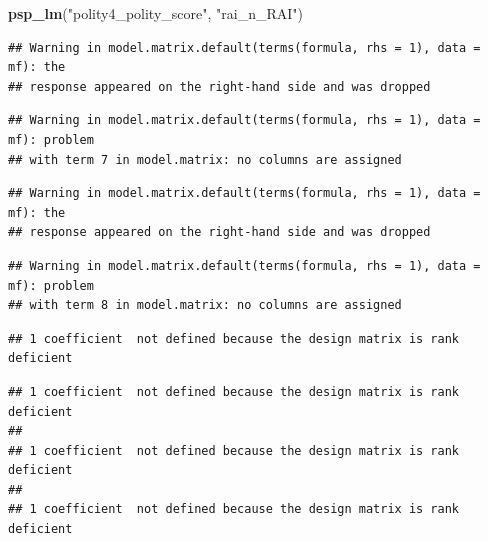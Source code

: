 \documentclass[
]{article}
\newenvironment{Shaded}{\begin{snugshade}}{\end{snugshade}}
\newcommand{\KeywordTok}[1]{\textcolor[rgb]{0.13,0.29,0.53}{\textbf{#1}}}
\newcommand{\NormalTok}[1]{#1}
\newcommand{\StringTok}[1]{\textcolor[rgb]{0.31,0.60,0.02}{#1}}
\begin{document}
\begin{Shaded}
\begin{Highlighting}[]
\KeywordTok{psp_lm}\NormalTok{(}\StringTok{"polity4_polity_score"}\NormalTok{, }\StringTok{"rai_n_RAI"}\NormalTok{)}
\end{Highlighting}
\end{Shaded}

\begin{verbatim}
## Warning in model.matrix.default(terms(formula, rhs = 1), data = mf): the
## response appeared on the right-hand side and was dropped
\end{verbatim}

\begin{verbatim}
## Warning in model.matrix.default(terms(formula, rhs = 1), data = mf): problem
## with term 7 in model.matrix: no columns are assigned
\end{verbatim}

\begin{verbatim}
## Warning in model.matrix.default(terms(formula, rhs = 1), data = mf): the
## response appeared on the right-hand side and was dropped
\end{verbatim}

\begin{verbatim}
## Warning in model.matrix.default(terms(formula, rhs = 1), data = mf): problem
## with term 8 in model.matrix: no columns are assigned
\end{verbatim}

\begin{verbatim}
## 1 coefficient  not defined because the design matrix is rank deficient
\end{verbatim}

\begin{verbatim}
## 1 coefficient  not defined because the design matrix is rank deficient
## 
## 1 coefficient  not defined because the design matrix is rank deficient
## 
## 1 coefficient  not defined because the design matrix is rank deficient
\end{verbatim}
\end{document}

